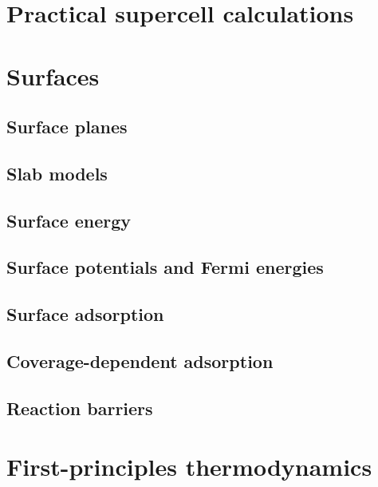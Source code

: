 \documentclass[11pt]{article}
\begin{document}
\section{Practical supercell calculations}
\label{sec-10}
\newpage
\section{Surfaces}
\label{sec-11}
\subsection{Surface planes}
\label{sec-11-1}
\subsection{Slab models}
\label{sec-11-2}
\subsection{Surface energy}
\label{sec-11-3}
\subsection{Surface potentials and Fermi energies}
\label{sec-11-4}
\subsection{Surface adsorption}
\label{sec-11-5}
\subsection{Coverage-dependent adsorption}
\label{sec-11-6}
\subsection{Reaction barriers}
\label{sec-11-7}

\newpage
\section{First-principles thermodynamics}
\label{sec-12}
\end{document}
